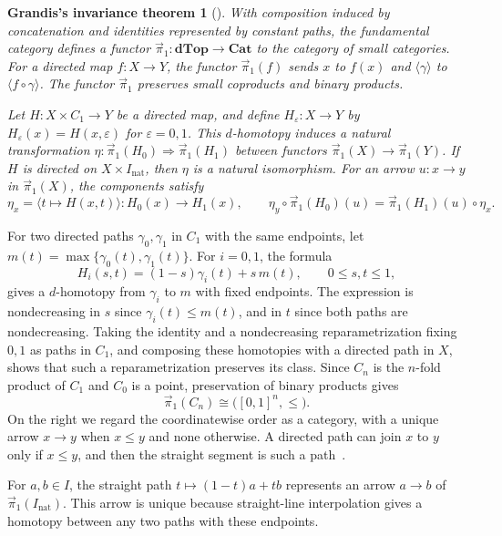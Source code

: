 \documentclass[12pt,a4paper]{amsart}
\newtheorem*{grandisInvariance}{Grandis's invariance theorem}
\theoremstyle{definition}
\renewcommand{\leq}{\leqslant}
\renewcommand{\vec}{\overrightarrow}
\newcommand{\D}{\mathbf{dTop}}
\newcommand{\Cat}{\mathbf{Cat}}
\newcommand{\rev}[1]{#1_{\mathrm{nat}}}
\newcommand{\Iv}{\rev{I}}
\newcommand{\cube}[1]{C_{#1}}
\newcommand{\PiC}{\vec{\pi}_1}
\newcommand{\clp}[1]{\langle #1\rangle}
\begin{document}
\begin{grandisInvariance}[{\cite[Theorem~3.2(a),(c),(d)]{mg}}]
With composition induced by concatenation and identities represented by constant paths, the fundamental category defines a functor $\PiC\colon\D\to\Cat$ to the category of small categories. For a directed map $f\colon X\to Y$, the functor $\PiC(f)$ sends $x$ to $f(x)$ and $\clp{\gamma}$ to $\clp{f\circ\gamma}$. The functor $\PiC$ preserves small coproducts and binary products.

Let $H\colon X\times\cube1\to Y$ be a directed map, and define $H_\varepsilon\colon X\to Y$ by $H_\varepsilon(x)=H(x,\varepsilon)$ for $\varepsilon=0,1$. This $d$-homotopy induces a natural transformation $\eta\colon\PiC(H_0)\Rightarrow\PiC(H_1)$ between functors $\PiC(X)\to\PiC(Y)$. If $H$ is directed on $X\times\Iv$, then $\eta$ is a natural isomorphism. For an arrow $u\colon x\to y$ in $\PiC(X)$, the components satisfy
\begin{equation}\label{eq:homotopy}
 \eta_x=\clp{t\mapsto H(x,t)}\colon H_0(x)\to H_1(x),\qquad
 \eta_y\circ\PiC(H_0)(u)=\PiC(H_1)(u)\circ\eta_x.
\end{equation}
\end{grandisInvariance}

For two directed paths $\gamma_0,\gamma_1$ in $\cube1$ with the same endpoints, let $m(t)=\max\{\gamma_0(t),\gamma_1(t)\}$. For $i=0,1$, the formula
\[
 H_i(s,t)=(1-s)\gamma_i(t)+s\,m(t),\qquad 0\leq s,t\leq1,
\]
gives a $d$-homotopy from $\gamma_i$ to $m$ with fixed endpoints. The expression is nondecreasing in $s$ since $\gamma_i(t)\leq m(t)$, and in $t$ since both paths are nondecreasing. Taking the identity and a nondecreasing reparametrization fixing $0,1$ as paths in $\cube 1$, and composing these homotopies with a directed path in $X$, shows that such a reparametrization preserves its class. Since $\cube n$ is the $n$-fold product of $\cube1$ and $\cube0$ is a point, preservation of binary products gives
\begin{equation}\label{eq:thin}
 \PiC(\cube n)\cong\bigl([0,1]^n,\leq\bigr).
\end{equation}
On the right we regard the coordinatewise order as a category, with a unique arrow $x\to y$ when $x\leq y$ and none otherwise. A directed path can join $x$ to $y$ only if $x\leq y$, and then the straight segment is such a path~\cite[Section~3.4(a),(c)]{mg}.

For $a,b\in I$, the straight path $t\mapsto(1-t)a+tb$ represents an arrow $a\to b$ of $\PiC(\Iv)$. This arrow is unique because straight-line interpolation gives a homotopy between any two paths with these endpoints.
\end{document}
